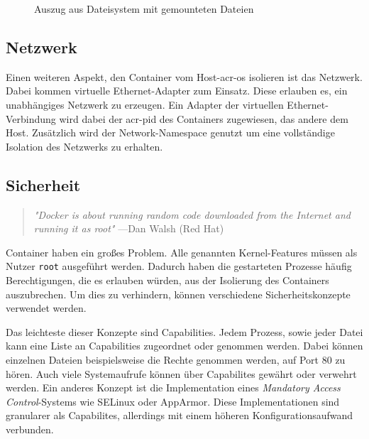 \begin{figure}[h]
	\centering
	\begin{minipage}{0.9\textwidth}
	\end{minipage}
	\caption{Auszug aus Dateisystem mit gemounteten Dateien}
	\label{fig:mountExample}
\end{figure}

\subsection{Netzwerk}
\label{sec:netzwerk}

Einen weiteren Aspekt, den Container vom Host-\gls{acr-os} isolieren ist das Netzwerk. Dabei kommen virtuelle Ethernet-Adapter zum Einsatz. Diese erlauben es, ein unabhängiges Netzwerk zu erzeugen. Ein Adapter der virtuellen Ethernet-Verbindung wird dabei der \gls{acr-pid} des Containers zugewiesen, das andere dem Host. Zusätzlich wird der Network-Namespace genutzt um eine vollständige Isolation des Netzwerks zu erhalten.

\subsection{Sicherheit}
\label{sec:sicherheit}

\begin{quote}
	\textit{"Docker is about running random code downloaded from the Internet and running it as root"}
	\flushright
	\small{---Dan Walsh (Red Hat)}
\end{quote}

Container haben ein großes Problem. Alle genannten Kernel-Features müssen als Nutzer \texttt{root} ausgeführt werden. Dadurch haben die gestarteten Prozesse häufig Berechtigungen, die es erlauben würden, aus der Isolierung des Containers auszubrechen. Um dies zu verhindern, können verschiedene Sicherheitskonzepte verwendet werden.

Das leichteste dieser Konzepte sind Capabilities. Jedem Prozess, sowie jeder Datei kann eine Liste an Capabilities zugeordnet oder genommen werden. Dabei können einzelnen Dateien beispielsweise die Rechte genommen werden, auf Port 80 zu hören. Auch viele Systemaufrufe können über Capabilites gewährt oder verwehrt werden. Ein anderes Konzept ist die Implementation eines \textit{Mandatory Access Control}-Systems wie SELinux oder AppArmor. Diese Implementationen sind granularer als Capabilites, allerdings mit einem höheren Konfigurationsaufwand verbunden.

